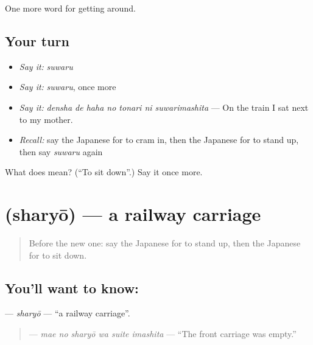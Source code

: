 \begin{grammarlens}[title={What you've built}]
One more word for getting around.
\end{grammarlens}

\subsection*{Your turn}
\begin{itemize}
\raggedright
  \item \emph{Say it:} \emph{suwaru}
  \item \emph{Say it:} \emph{suwaru}, once more
  \item \emph{Say it:} \emph{densha de haha no tonari ni suwarimashita} — On the train I sat next to my mother.
  \item \emph{Recall:} say the Japanese for to cram in, then the Japanese for to stand up, then say \emph{suwaru} again
\end{itemize}

\begin{tcolorbox}[breakable,colback=teal!4,colframe=teal!35!black,title={Before you move on}]
What does  mean? (\textquotedblleft{}To sit down\textquotedblright{}.) Say it once more.
\end{tcolorbox}
\section[\texorpdfstring{\ja{しゃりょう} (sharyō)}{しゃりょう (sharyō)}]{ (sharyō) — a railway carriage}

\label{lesson:JA-C379-sharyou}



\begin{quote}
Before the new one: say the Japanese for to stand up, then the Japanese for to sit down.
\end{quote}

\subsection*{You'll want to know: }
\textbf{} — \emph{sharyō} — \textquotedblleft{}a railway carriage\textquotedblright{}.

\begin{quote}
\textbf{  } — \emph{mae no sharyō wa suite imashita} — \textquotedblleft{}The front carriage was empty.\textquotedblright{}
\end{quote}

